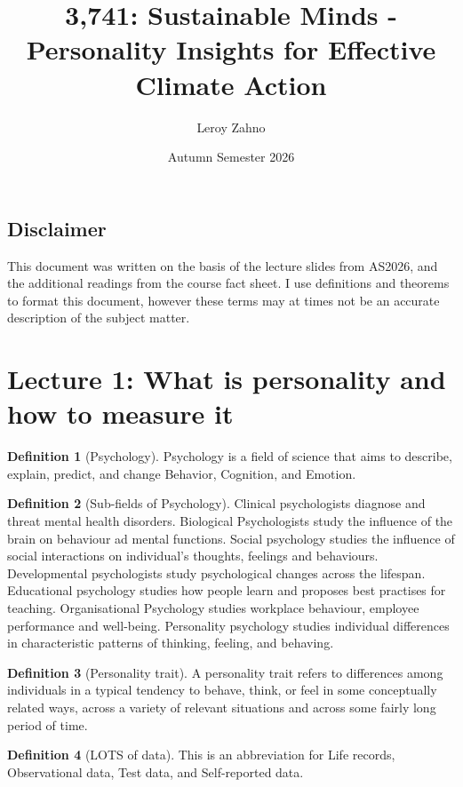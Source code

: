 \documentclass{article}
\title{3,741: Sustainable Minds - Personality Insights for Effective Climate Action}
\author{Leroy Zahno}
\date{Autumn Semester 2026}
\makeatletter
\renewcommand{\maketitle}{%
  \begin{center}
    {\LARGE \@title \par}
    \vspace{1em}
    {\large \@author \par}
    \vspace{1em}
    {\large \@date \par}
  \end{center}
}
\theoremstyle{definition}
\newtheorem{definition}{Definition}
\theoremstyle{Solution}
\makeatother
\begin{document}
\maketitle

\subsection{Disclaimer}

This document was written on the basis of the lecture slides from AS2026, and the additional readings from the course fact sheet. I use definitions and theorems to format this document, however these terms may at times not be an accurate description of the subject matter. 

\tableofcontents

\section{Lecture 1: What is personality and how to measure it}

\begin{definition}[Psychology]
Psychology is a field of science that aims to describe, explain, predict, and change Behavior, Cognition, and Emotion.
\end{definition}

\begin{definition}[Sub-fields of Psychology]
Clinical psychologists diagnose and threat mental health disorders. Biological Psychologists study the influence of the brain on behaviour ad mental functions. Social psychology studies the influence of social interactions on individual's thoughts, feelings and behaviours. Developmental psychologists study psychological changes across the lifespan. Educational psychology studies how people learn and proposes best practises for teaching. Organisational Psychology studies workplace behaviour, employee performance and well-being. Personality psychology studies individual differences in characteristic patterns of thinking, feeling, and behaving.
\end{definition}

\begin{definition}[Personality trait]
A personality trait refers to differences among individuals in a typical tendency to behave, think, or feel in some conceptually related ways, across a variety of relevant situations and across some fairly long period of time. 
\end{definition}

\begin{definition}[LOTS of data]
This is an abbreviation for Life records, Observational data, Test data, and Self-reported data. 
\end{definition}
\end{document}

